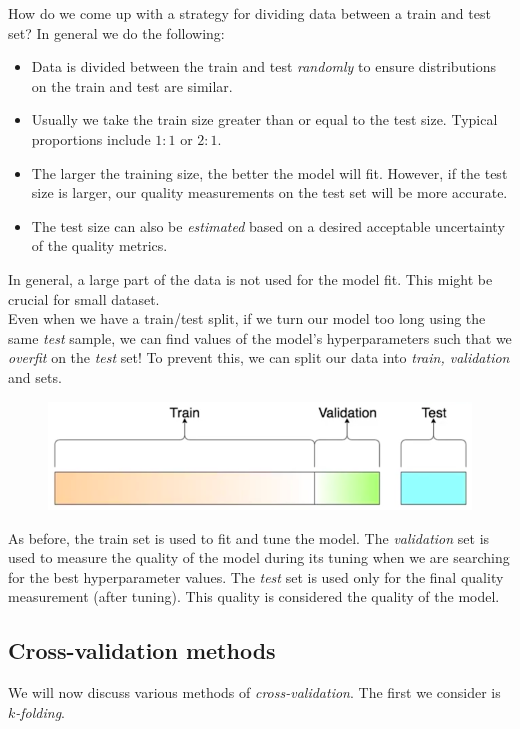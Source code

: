 How do we come up with a strategy for dividing data between a train and test set? In general we do the following:
\begin{itemize}
\item Data is divided between the train and test \textit{randomly} to ensure distributions on the train and test are similar.
\item Usually we take the train size greater than or equal to the test size. Typical proportions include $1:1$ or $2:1$.
\item The larger the training size, the better the model will fit. However, if the test size is larger, our quality measurements on the test set will be more accurate.
\item The test size can also be \textit{estimated} based on a desired acceptable uncertainty of the quality metrics.
\end{itemize}
In general, a large part of the data is not used for the model fit. This might be crucial for small dataset.\\

Even when we have a train/test split, if we turn our model too long using the same \textit{test} sample, we can find values of the model's hyperparameters such that we \textit{overfit} on the \textit{test} set! To prevent this, we can split our data into \textit{train, validation} and  sets.
\begin{figure}[H]
\centering
\includegraphics[scale=0.4]{traintestvalidation.png}
\end{figure}
As before, the train set is used to fit and tune the model. The \textit{validation} set is used to measure the quality of the model during its tuning when we are searching for the best hyperparameter values. The \textit{test} set is used only for the final quality measurement (after tuning). This quality is considered the quality of the model.



\newpage
\subsection{Cross-validation methods}
We will now discuss various methods of \textit{cross-validation}. The first we consider is \textit{$k$-folding}. 

